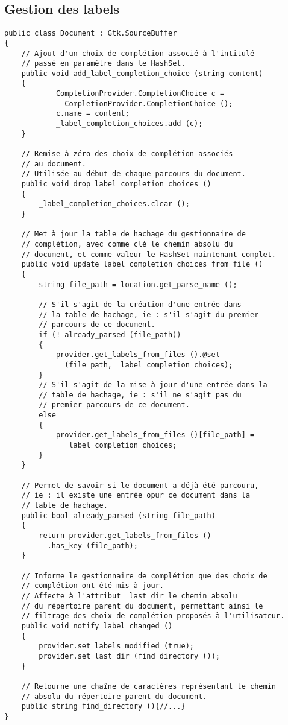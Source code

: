 \documentclass[a4paper,11pt]{report}
\begin{document}
\subsection{Gestion des labels}
\label{ssec:gestion_des_labels}

\begin{lstlisting}[frame=single]
public class Document : Gtk.SourceBuffer
{
    // Ajout d'un choix de complétion associé à l'intitulé
    // passé en paramètre dans le HashSet.
    public void add_label_completion_choice (string content)
    {
            CompletionProvider.CompletionChoice c = 
              CompletionProvider.CompletionChoice ();
            c.name = content;
            _label_completion_choices.add (c);
    }
    
    // Remise à zéro des choix de complétion associés
    // au document.
    // Utilisée au début de chaque parcours du document.
    public void drop_label_completion_choices ()
    {
        _label_completion_choices.clear ();
    }
    
    // Met à jour la table de hachage du gestionnaire de
    // complétion, avec comme clé le chemin absolu du
    // document, et comme valeur le HashSet maintenant complet.
    public void update_label_completion_choices_from_file ()
    {
        string file_path = location.get_parse_name ();
        
        // S'il s'agit de la création d'une entrée dans
        // la table de hachage, ie : s'il s'agit du premier
        // parcours de ce document.
        if (! already_parsed (file_path))
        {
            provider.get_labels_from_files ().@set
              (file_path, _label_completion_choices);
        }
        // S'il s'agit de la mise à jour d'une entrée dans la
        // table de hachage, ie : s'il ne s'agit pas du
        // premier parcours de ce document.
        else
        {
            provider.get_labels_from_files ()[file_path] =
              _label_completion_choices;
        }
    }
        
    // Permet de savoir si le document a déjà été parcouru,
    // ie : il existe une entrée opur ce document dans la
    // table de hachage.
    public bool already_parsed (string file_path)
    {
        return provider.get_labels_from_files ()
          .has_key (file_path);
    }
    
    // Informe le gestionnaire de complétion que des choix de
    // complétion ont été mis à jour.
    // Affecte à l'attribut _last_dir le chemin absolu
    // du répertoire parent du document, permettant ainsi le
    // filtrage des choix de complétion proposés à l'utilisateur.
    public void notify_label_changed ()
    {
        provider.set_labels_modified (true);
        provider.set_last_dir (find_directory ());
    }
    
    // Retourne une chaîne de caractères représentant le chemin
    // absolu du répertoire parent du document.
    public string find_directory (){//...}
}
\end{lstlisting}
\end{document}
